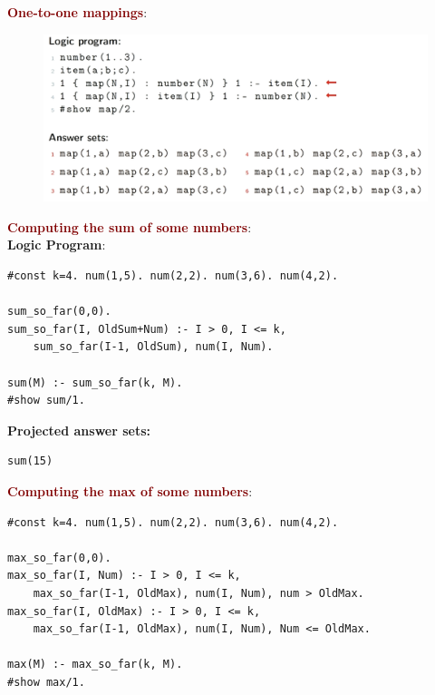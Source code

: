 \vspace{0.35cm}

{\Large \textbf{\textcolor{Maroon}{One-to-one mappings}}}: 
\begin{figure}[ht!]
    \includegraphics[scale=0.6]{figures/one-to-one.png}
\end{figure}

{\Large \textbf{\textcolor{Maroon}{Computing the sum of some numbers}}}: \\
\textbf{Logic Program}:
\begin{lstlisting}
#const k=4. num(1,5). num(2,2). num(3,6). num(4,2).

sum_so_far(0,0).
sum_so_far(I, OldSum+Num) :- I > 0, I <= k,
    sum_so_far(I-1, OldSum), num(I, Num).
    
sum(M) :- sum_so_far(k, M).
#show sum/1.
\end{lstlisting}

\vspace{0.25cm}

\textbf{Projected answer sets:}
\begin{lstlisting}
sum(15)
\end{lstlisting}

\vspace{0.35cm}

{\Large \textbf{\textcolor{Maroon}{Computing the max of some numbers}}}: 
\begin{lstlisting}
#const k=4. num(1,5). num(2,2). num(3,6). num(4,2).

max_so_far(0,0).
max_so_far(I, Num) :- I > 0, I <= k,
    max_so_far(I-1, OldMax), num(I, Num), num > OldMax.
max_so_far(I, OldMax) :- I > 0, I <= k,
    max_so_far(I-1, OldMax), num(I, Num), Num <= OldMax.
    
max(M) :- max_so_far(k, M).
#show max/1.
\end{lstlisting}

\vspace{0.25cm}

